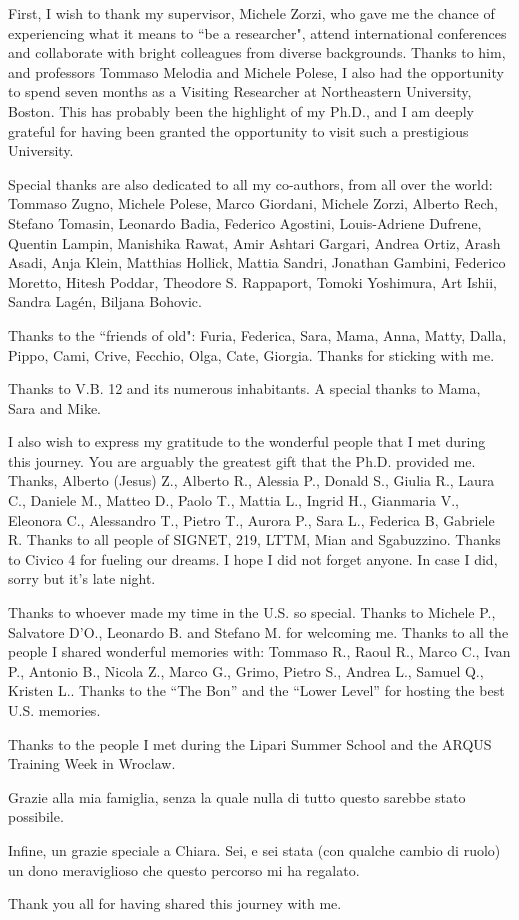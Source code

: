 \clearpairofpagestyles
\rohead*{}
\rehead*{}
\lohead*{}
\lehead*{}
\rofoot{}
\lefoot{}

\small

First, I wish to thank my supervisor, Michele Zorzi, who gave me the chance of experiencing what it means to ``be a researcher", attend international conferences and collaborate with bright colleagues from diverse backgrounds.
Thanks to him, and professors Tommaso Melodia and Michele Polese, I also had the opportunity to spend seven
months as a Visiting Researcher at Northeastern University, Boston. This has probably been the highlight of my Ph.D., and I am deeply grateful for having been granted the opportunity to visit such a prestigious University.

Special thanks are also dedicated to all my co-authors, from all over the world:
Tommaso Zugno, Michele Polese, Marco Giordani, Michele Zorzi,
Alberto Rech, Stefano Tomasin, Leonardo Badia, Federico Agostini, Louis-Adriene Dufrene, Quentin Lampin, Manishika Rawat,
Amir Ashtari Gargari, Andrea Ortiz, Arash Asadi, Anja Klein, Matthias Hollick,
Mattia Sandri,
Jonathan Gambini, Federico Moretto,
Hitesh Poddar, Theodore S. Rappaport, Tomoki Yoshimura, Art Ishii,
Sandra Lagén, Biljana Bohovic.

Thanks to the ``friends of old": Furia, Federica, Sara, Mama, Anna, Matty, Dalla, Pippo, Cami, Crive, Fecchio, Olga, Cate, Giorgia. Thanks for sticking with me.

Thanks to V.B. 12 and its numerous inhabitants. A special thanks to Mama, Sara and Mike.

I also wish to express my gratitude to the wonderful people that I met during this journey.
You are arguably the greatest gift that the Ph.D. provided me. 
Thanks, Alberto (Jesus) Z., Alberto R., Alessia P., Donald S., Giulia R., Laura C., Daniele M., Matteo D., Paolo T., Mattia L., Ingrid H., Gianmaria V., Eleonora C., Alessandro T., Pietro T., Aurora P., Sara L., Federica B, Gabriele R.
Thanks to all people of SIGNET, 219, LTTM, Mian and Sgabuzzino.
Thanks to Civico 4 for fueling our dreams.
I hope I did not forget anyone. In case I did, sorry but it's late night.

Thanks to whoever made my time in the U.S. so special. Thanks to Michele P., Salvatore D'O., Leonardo B. and Stefano M. for welcoming me.
Thanks to all the people I shared wonderful memories with: Tommaso R., Raoul R., Marco C., Ivan P., Antonio B., Nicola Z., Marco G., Grimo, Pietro S., Andrea L., Samuel Q., Kristen L..
Thanks to the ``The Bon'' and the ``Lower Level'' for hosting the best U.S. memories.

Thanks to the people I met during the Lipari Summer School and the ARQUS Training Week in Wroclaw.

Grazie alla mia famiglia, senza la quale nulla di tutto questo sarebbe stato possibile.

Infine, un grazie speciale a Chiara. Sei, e sei stata (con qualche cambio di ruolo) un dono meraviglioso che questo percorso mi ha regalato.

\normalsize
Thank you all for having shared this journey with me.